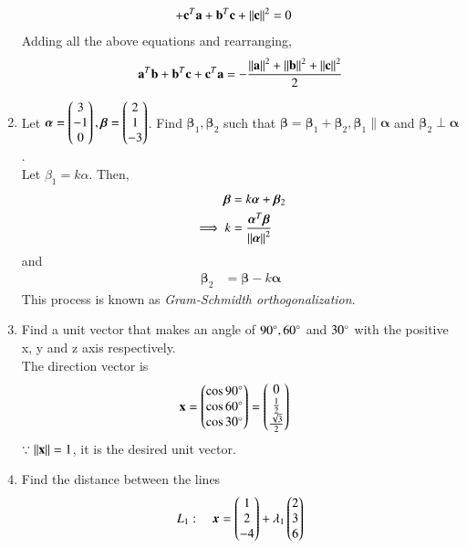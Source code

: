 \begin{enumerate}[label=\arabic*.,ref=\thesubsection.\theenumi]
\begin{align}
\\
+\mathbf{c}^T\mathbf{a}+\mathbf{b}^T\mathbf{c}+\left\lVert \mathbf{c}\right\rVert^2 &= 0
\end{align}
%
Adding all the above equations and rearranging,
\begin{multline}
 \mathbf{a}^T\mathbf{b}+\mathbf{b}^T\mathbf{c}+\mathbf{c}^T\mathbf{a} = -\frac{\left\lVert \mathbf{a}\right\rVert^2+\left\lVert \mathbf{b}\right\rVert^2+\left\lVert \mathbf{c}\right\rVert^2}{2}
\end{multline}
%
\item Let $\bm{\alpha} = \begin{pmatrix}3\\-1\\0\end{pmatrix}, \bm{\beta} = \begin{pmatrix}2\\1\\-3\end{pmatrix}$.  Find $\bm{\beta}_1, \bm{\beta}_2 $ such that $\bm{\beta}=\bm{\beta}_1+\bm{\beta}_2, \bm{\beta}_1 \parallel  \bm{\alpha} $ and $\bm{\beta}_2 \perp \bm{\alpha} $.
%
\label{prob:line_gram_schmidt}
\\
\solution Let $\beta_1 = k\alpha$.  Then, 
%
\begin{align}
\bm{\beta} &= k\bm{\alpha}+\bm{\beta}_2
\\
\implies k &= \frac{\bm{\alpha}^T\bm{\beta}}{\left\lVert\bm{\alpha}\right\rVert^2}
\end{align}
%
and 
%
\begin{align}
\bm{\beta}_2 &= \bm{\beta}-k\bm{\alpha}
\end{align}
%
This process is known as {\em Gram-Schmidth orthogonalization}.
\item Find a unit vector that makes an angle of $90\degree, 60\degree$ and $30\degree$ with the positive x, y and z axis respectively.
%
\\
\solution
The direction vector is
%
\begin{align}
\label{eq:line_dir_cos}
\mathbf{x} &= \begin{pmatrix}\cos 90\degree\\\cos 60\degree \\ \cos 30\degree\end{pmatrix} = \begin{pmatrix}0 \\ \frac{1}{2}\\\frac{\sqrt{3}}{2}\end{pmatrix}
\end{align}
%
$\because \left\lVert\mathbf{x}\right\rVert=1$, it is the desired unit vector.
%
\item Find the 
distance between the lines 
\begin{align}
L_1: \quad \bm{x} &= \myvec{1\\2\\-4} + \lambda_1\myvec{2 \\ 3 \\6}
\\

\end{align}
\end{enumerate}
